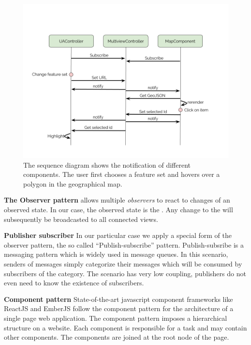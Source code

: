 \begin{figure}[h!]
  \centering
  \includegraphics[width=\textwidth]{images/sequence-diagram.png}
  \caption{%
    The sequence diagram shows the notification of different components.
  The user first chooses a feature set and hovers over a polygon in the geographical map.
  }\label{fig:implementation:sequence-diagram}
\end{figure}


\textbf{The Observer pattern} allows multiple \emph{observers} to react to changes of an observed state.
In our case, the observed state is the .
Any change to the  will subsequently be broadcasted to all connected views.


\textbf{Publisher subscriber}
In our particular case we apply a special form of the observer pattern, the so called ``Publish-subscribe'' pattern\cite{Eugster2003}.
Publish-subsribe is a messaging pattern which is widely used in message queues.
In this scenario, senders of messages simply categorize their messages which will be consumed by subscribers of the category.
The scenario has very low coupling, publishers do not even need to know the existence of subscribers.

\textbf{Component pattern}
State-of-the-art javascript component frameworks like ReactJS and EmberJS follow the component pattern for the architecture of a single page web application.
The component pattern imposes a hierarchical structure on a website.
Each component is responsible for a task and may contain other components.
The components are joined at the root node of the page.

